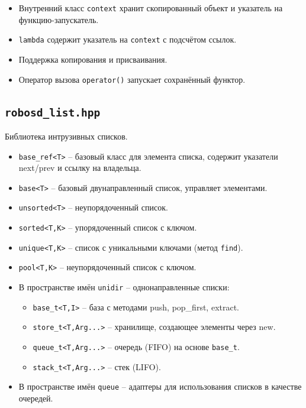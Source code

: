 \documentclass[a4paper,12pt]{article}
\begin{document}
\begin{itemize}
    \item Внутренний класс \texttt{context} хранит скопированный объект и указатель на функцию-запускатель.
    \item \texttt{lambda} содержит указатель на \texttt{context} с подсчётом ссылок.
    \item Поддержка копирования и присваивания.
    \item Оператор вызова \texttt{operator()} запускает сохранённый функтор.
\end{itemize}

\subsection{\texttt{robosd\_list.hpp}}

Библиотека интрузивных списков.

\begin{itemize}
    \item \texttt{base\_ref<T>} -- базовый класс для элемента списка, содержит указатели next/prev и ссылку на владельца.
    \item \texttt{base<T>} -- базовый двунаправленный список, управляет элементами.
    \item \texttt{unsorted<T>} -- неупорядоченный список.
    \item \texttt{sorted<T,K>} -- упорядоченный список с ключом.
    \item \texttt{unique<T,K>} -- список с уникальными ключами (метод \texttt{find}).
    \item \texttt{pool<T,K>} -- неупорядоченный список с ключом.
    \item В пространстве имён \texttt{unidir} -- однонаправленные списки:
        \begin{itemize}
            \item \texttt{base\_t<T,I>} -- база с методами push, pop\_first, extract.
            \item \texttt{store\_t<T,Arg...>} -- хранилище, создающее элементы через new.
            \item \texttt{queue\_t<T,Arg...>} -- очередь (FIFO) на основе \texttt{base\_t}.
            \item \texttt{stack\_t<T,Arg...>} -- стек (LIFO).
        \end{itemize}
    \item В пространстве имён \texttt{queue} -- адаптеры для использования списков в качестве очередей.
\end{itemize}
\end{document}
